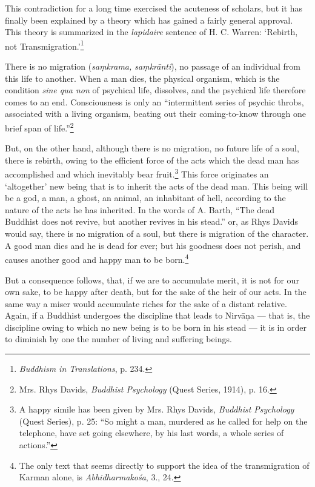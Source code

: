\documentclass[a4paper, 11pt, oneside, english, landscape]{article}
\begin{document}
This contradiction for a long time exercised the acuteness of scholars, but it has finally been explained by a theory which has gained a fairly general approval. This theory is summarized in the \emph{lapidaire} sentence of H. C. Warren: `Rebirth, not Transmigration.'\footnote{\emph{Buddhism in Translations}, p. 234.}

There is no migration (\emph{saṃkrama, saṃkrānti}), no passage of an individual from this life to another. When a man dies, the physical organism, which is the condition \emph{sine qua non} of psychical life, dissolves, and the psychical life therefore comes to an end. Consciousness is only an ``intermittent series of psychic throbs, associated with a living organism, beating out their coming-to-know through one brief span of life.''\footnote{Mrs. Rhys Davids, \emph{Buddhist Psychology} (Quest Series, 1914), p. 16.}

But, on the other hand, although there is no migration, no future life of a soul, there is rebirth, owing to the efficient force of the acts which the dead man has accomplished and which inevitably bear fruit.\footnote{A happy simile has been given by Mrs. Rhys Davids, \emph{Buddhist Psychology} (Quest Series), p. 25: ``So might a man, murdered as he called for help on the telephone, have set going elsewhere, by his last words, a whole series of actions.''} This force originates an `altogether' new being that is to inherit the acts of the dead man. This being will be a god, a man, a ghost, an animal, an inhabitant of hell, according to the nature of the acts he has inherited. In the words of A. Barth, ``The dead Buddhist does not revive, but another revives in his stead.'' or, as Rhys Davids would say, there is no migration of a soul, but there is migration of the character. A good man dies and he is dead for ever; but his goodness does not perish, and causes another good and happy man to be born.\footnote{The only text that seems directly to support the idea of the transmigration of Karman alone, is \emph{Abhidharmakośa}, 3., 24.}

But a consequence follows, that, if we are to accumulate merit, it is not for our own sake, to be happy after death, but for the sake of the heir of our acts. In the same way a miser would accumulate riches for the sake of a distant relative. Again, if a Buddhist undergoes the discipline that leads to Nirvāṇa --- that is, the discipline owing to which no new being is to be born in his stead --- it is in order to diminish by one the number of living and suffering beings.
\end{document}
